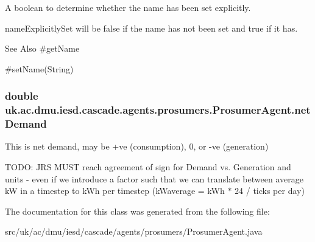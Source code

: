 A boolean to determine whether the name has been set explicitly. 

{\ttfamily name\-Explicitly\-Set} will be false if the name has not been set and true if it has. \begin{DoxySeeAlso}{See Also}
\#get\-Name 

\#set\-Name(\-String) 
\end{DoxySeeAlso}
\hypertarget{classuk_1_1ac_1_1dmu_1_1iesd_1_1cascade_1_1agents_1_1prosumers_1_1_prosumer_agent_af17266e09c606c54fb838282138b92a4}{
\subsubsection[{net\-Demand}]{\setlength{\rightskip}{0pt plus 5cm}double uk.\-ac.\-dmu.\-iesd.\-cascade.\-agents.\-prosumers.\-Prosumer\-Agent.\-net\-Demand\hspace{0.3cm}{\ttfamily [protected]}}}\label{classuk_1_1ac_1_1dmu_1_1iesd_1_1cascade_1_1agents_1_1prosumers_1_1_prosumer_agent_af17266e09c606c54fb838282138b92a4}


This is net demand, may be +ve (consumption), 0, or -\/ve (generation) 

T\-O\-D\-O\-: J\-R\-S M\-U\-S\-T reach agreement of sign for Demand vs. Generation and units -\/ even if we introduce a factor such that we can translate between average k\-W in a timestep to k\-Wh per timestep (k\-Waverage = k\-Wh $\ast$ 24 / ticks per day) 

The documentation for this class was generated from the following file\-:\begin{DoxyCompactItemize}
\item 
src/uk/ac/dmu/iesd/cascade/agents/prosumers/Prosumer\-Agent.\-java\end{DoxyCompactItemize}
